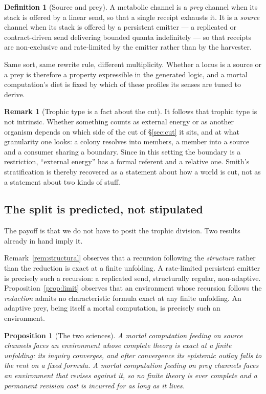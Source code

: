 \documentclass[11pt]{article}
\theoremstyle{plain}
\newtheorem{proposition}[theorem]{Proposition}
\theoremstyle{definition}
\newtheorem{definition}[theorem]{Definition}
\newtheorem{remark}[theorem]{Remark}
\begin{document}
\begin{definition}[Source and prey]
\label{def:source}
A metabolic channel is a \emph{prey} channel when its stack is offered by a linear send, so that a
single receipt exhausts it. It is a \emph{source} channel when its stack is offered by a persistent
emitter --- a replicated or contract-driven send delivering bounded quanta indefinitely --- so that
receipts are non-exclusive and rate-limited by the emitter rather than by the harvester.
\end{definition}

Same sort, same rewrite rule, different multiplicity. Whether a locus is a source or a prey is
therefore a property expressible in the generated logic, and a mortal computation's diet is fixed by
which of these profiles its senses are tuned to derive.

\begin{remark}[Trophic type is a fact about the cut]
\label{rem:cut}
It follows that trophic type is not intrinsic. Whether something counts as external energy or as
another organism depends on which side of the cut of \S\ref{sec:cut} it sits, and at what granularity
one looks: a colony resolves into members, a member into a source and a consumer sharing a boundary.
Since in this setting the boundary is a restriction, ``external energy'' has a formal referent and a
relative one. Smith's stratification is thereby recovered as a statement about how a world is cut, not
as a statement about two kinds of stuff.
\end{remark}

\subsection{The split is predicted, not stipulated}

The payoff is that we do not have to posit the trophic division. Two results already in hand imply it.

Remark~\ref{rem:structural} observes that a recursion following the \emph{structure} rather than the
reduction is exact at a finite unfolding. A rate-limited persistent emitter is precisely such a
recursion: a replicated send, structurally regular, non-adaptive. Proposition~\ref{prop:limit}
observes that an environment whose recursion follows the \emph{reduction} admits no characteristic
formula exact at any finite unfolding. An adaptive prey, being itself a mortal computation, is
precisely such an environment.

\begin{proposition}[The two sciences]
\label{prop:twosciences}
A mortal computation feeding on source channels faces an environment whose complete theory is exact at
a finite unfolding: its inquiry converges, and after convergence its epistemic outlay falls to the
rent on a fixed formula. A mortal computation feeding on prey channels faces an environment that
revises against it, so no finite theory is ever complete and a permanent revision cost is incurred for
as long as it lives.
\end{proposition}
\end{document}
